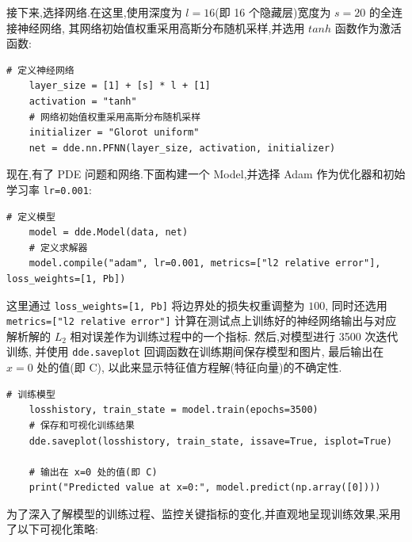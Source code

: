 \documentclass{Sichuan Normal University}
\begin{document}
接下来,选择网络.在这里,使用深度为 $l=16$(即 16 个隐藏层)宽度为 $s=20$ 的全连接神经网络, 其网络初始值权重采用高斯分布随机采样,并选用 $tanh$ 函数作为激活函数:
\begin{lstlisting}[style=python,basicstyle=\footnotesize\fontspec{Courier New},]  
    # 定义神经网络
    layer_size = [1] + [s] * l + [1]
    activation = "tanh"
    # 网络初始值权重采用高斯分布随机采样
    initializer = "Glorot uniform"
    net = dde.nn.PFNN(layer_size, activation, initializer)
\end{lstlisting}
现在,有了 PDE 问题和网络.下面构建一个 Model,并选择 Adam 作为优化器和初始学习率 \texttt{lr=0.001}:
\begin{lstlisting}[style=python,basicstyle=\footnotesize\fontspec{Courier New},]  
    # 定义模型
    model = dde.Model(data, net)
    # 定义求解器
    model.compile("adam", lr=0.001, metrics=["l2 relative error"], loss_weights=[1, Pb])
\end{lstlisting}
这里通过 \texttt{loss\_weights=[1, Pb]} 将边界处的损失权重调整为 $100$, 同时还选用 \texttt{metrics=["l2 relative error"]} 计算在测试点上训练好的神经网络输出与对应解析解的 $L_2$ 相对误差作为训练过程中的一个指标.
然后,对模型进行 3500 次迭代训练, 并使用 \texttt{dde.saveplot} 回调函数在训练期间保存模型和图片, 最后输出在 $x=0$ 处的值(即 C), 以此来显示特征值方程解(特征向量)的不确定性.
\begin{lstlisting}[style=python,basicstyle=\footnotesize\fontspec{Courier New},]  
    # 训练模型
    losshistory, train_state = model.train(epochs=3500)
    # 保存和可视化训练结果
    dde.saveplot(losshistory, train_state, issave=True, isplot=True)

    # 输出在 x=0 处的值(即 C)
    print("Predicted value at x=0:", model.predict(np.array([0])))
\end{lstlisting}

为了深入了解模型的训练过程、监控关键指标的变化,并直观地呈现训练效果,采用了以下可视化策略:
\end{document}
